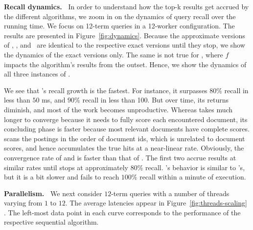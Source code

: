 {{{\bf Recall dynamics.\ } 
In order to understand how the top-k results get accrued by the different algorithms, we zoom in on the dynamics of query 
recall over the running time. We focus on 12-term queries in a 12-worker configuration. The results are presented in 
Figure~\ref{fig:dynamics}.
Because the approximate versions of \alg, \pRA, and \pJASS\ are  identical to the respective exact versions until they stop, 
we show the dynamics of the exact versions only.  The same is not true for \pBMW, where $f$ impacts the algorithm's results from the outset.
Hence, we show the dynamics of all three instances of \pBMW. 

We see that \alg's recall growth is the fastest. For instance, it surpasses $80\%$ recall in less than $50$ ms, 
and $90\%$ recall in less than 100. But over time, its returns  diminish, and most of the work becomes unproductive. Whereas
\pRA\/ takes much longer to converge because it needs to fully score each encountered document,  its concluding phase is faster because 
most relevant documents   have complete  scores. 
\pBMW\/ scans the postings in the order of document ids, which is unrelated to document scores, and hence accumulates the true hits 
at a near-linear rate. Obviously, the convergence rate of \pBMW\hi\/ and \pBMW\lo\/ is faster than that of \pBMW\ex. The first 
two accrue results at similar rates until \pBMW\lo\/ stops at approximately $80\%$ recall.
\pJASS's behavior  is similar to \alg's, but it is a bit slower and fails to reach $100\%$ recall within a minute of execution.

{\bf Parallelism.\ } 
We next consider  $12$-term queries with a number of threads varying from $1$ to $12$. 
The average latencies appear in Figure~\ref{fig:threads-scaling}
.  
The left-most data point in each curve corresponds to the performance of 
the respective sequential algorithm.

}}
